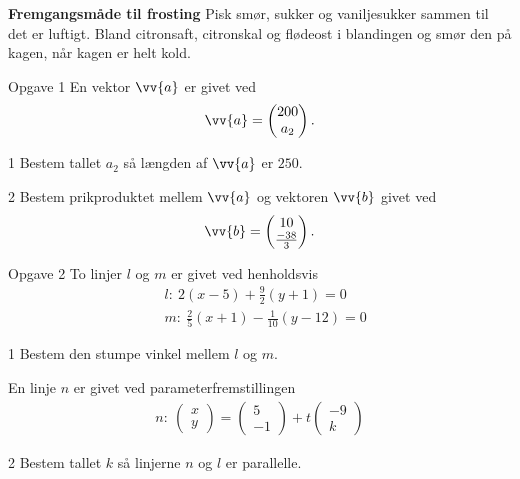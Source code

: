 \textbf{Fremgangsmåde til frosting}
Pisk smør, sukker og vaniljesukker sammen til det er luftigt. Bland citronsaft, citronskal og flødeost i blandingen og smør den på kagen, når kagen er helt kold. 

\newpage

\begin{opgavetekst}{Opgave 1}
	En vektor $\vv{a}$ er givet ved
	\begin{align*}
		\vv{a} = 
		\begin{pmatrix}
			200 \\
			a_2
		\end{pmatrix}.
	\end{align*}
\end{opgavetekst}	
\begin{delopgave}{1}
	Bestem tallet $a_2$ så længden af $\vv{a}$ er $250$.
\end{delopgave}
\begin{delopgave}{2}
	Bestem prikproduktet mellem $\vv{a}$ og vektoren $\vv{b}$ givet ved
	\begin{align*}
		\vv{b} = 
		\begin{pmatrix}
			10 \\
			\frac{-38}{3}
		\end{pmatrix}.
	\end{align*}
\end{delopgave}

\begin{opgavetekst}{Opgave 2}
	To linjer $l$ og $m$ er givet ved henholdsvis
	\begin{align*}
		&l: \ 2(x- 5) + \frac{9}{2}(y + 1) = 0\\
		&m: \ \frac{2}{5}(x+1) -\frac{1}{10}(y-12) = 0
	\end{align*}
\end{opgavetekst}
\begin{delopgave}{1}
	Bestem den stumpe vinkel mellem $l$ og $m$. 
\end{delopgave}
\begin{meretekst}
	En linje $n$ er givet ved parameterfremstillingen	
	\begin{align*}
		n: \ 
		\begin{pmatrix}
			x \\ y
		\end{pmatrix}
		=
		\begin{pmatrix}
			5 \\ -1
		\end{pmatrix} 
		+
		t
		\begin{pmatrix}
			-9 \\ k
		\end{pmatrix}
	\end{align*}
\end{meretekst}
\begin{delopgave}{2}
	Bestem tallet $k$ så linjerne $n$ og $l$ er parallelle. 
\end{delopgave}

